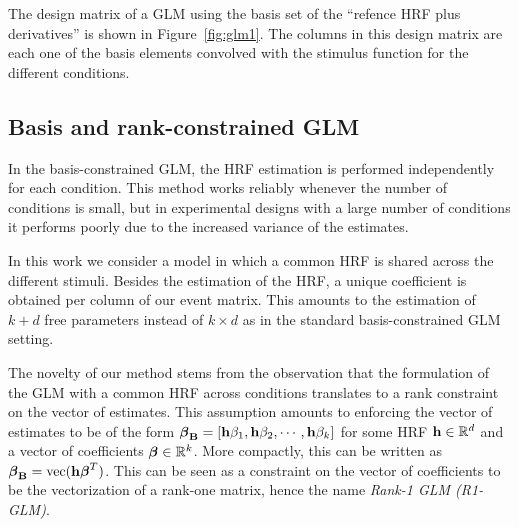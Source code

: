 The design matrix of a GLM using the basis set of the ``refence HRF plus derivatives'' is shown in Figure~\ref{fig:glm1}. The columns in this design matrix are each one of the basis elements convolved with the stimulus function for the different conditions.




\subsection{Basis and rank-constrained GLM}

In the basis-constrained GLM, the HRF estimation is performed 
independently for each condition. This method works reliably whenever
the number of conditions is small, but in experimental designs with a large
number of conditions it performs poorly due to the increased variance of the estimates.

In this work we consider a model in which a common HRF is shared
across the different stimuli. Besides the estimation of the HRF,
a unique coefficient is obtained per column of our event
matrix. This amounts to the estimation of $k + d$ free parameters
instead of $k \times d$ as in the standard basis-constrained GLM setting.

The novelty of our method stems from the observation that the formulation of the GLM with a
common HRF across conditions translates to a rank constraint on the vector of estimates. 
This assumption amounts to enforcing the vector of
estimates to be of the form ${\boldsymbol \beta}_{\mathbf{B}} = [\mathbf{h} {\beta}_1, \mathbf{h} \beta_2, \cdots, \mathbf{h}
\beta_k]$ for some HRF $\mathbf{h} \in {\mathbb R}^d$ and a vector of coefficients ${\boldsymbol \beta} \in {\mathbb R}^k$. More compactly, this can be written as ${\boldsymbol \beta}_{\mathbf{B}} = \operatorname*{vec}(\mathbf{h}
{\boldsymbol \beta}^T)$. This can be
seen as a constraint on the vector of coefficients to be the vectorization of a rank-one
matrix, hence the name {\it Rank-1 GLM (R1-GLM)}.


